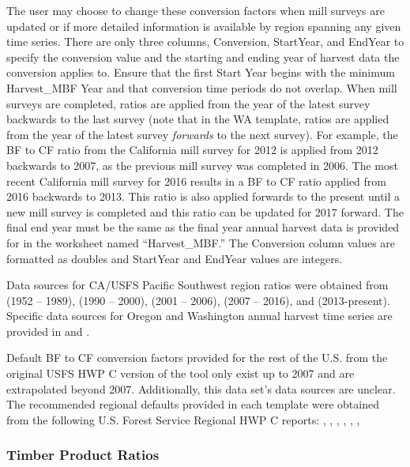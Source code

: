 \documentclass[
  openany]{book}
\begin{document}
The user may choose to change these conversion factors when mill surveys are updated or if more detailed information is available by region spanning any given time series. There are only three columns, Conversion, StartYear, and EndYear to specify the conversion value and the starting and ending year of harvest data the conversion applies to. Ensure that the first Start Year begins with the minimum Harvest\_MBF Year and that conversion time periods do not overlap. When mill surveys are completed, ratios are applied from the year of the latest survey backwards to the last survey (note that in the WA template, ratios are applied from the year of the latest survey \emph{forwards} to the next survey). For example, the BF to CF ratio from the California mill survey for 2012 is applied from 2012 backwards to 2007, as the previous mill survey was completed in 2006. The most recent California mill survey for 2016 results in a BF to CF ratio applied from 2016 backwards to 2013. This ratio is also applied forwards to the present until a new mill survey is completed and this ratio can be updated for 2017 forward. The final end year must be the same as the final year annual harvest data is provided for in the worksheet named ``Harvest\_MBF.'' The Conversion column values are formatted as doubles and StartYear and EndYear values are integers.

Data sources for CA/USFS Pacific Southwest region ratios were obtained from \textcite{keegan2010} (1952 -- 1989), \textcite{morgan2004} (1990 -- 2000), \textcite{morgan2012} (2001 -- 2006), \textcite{mciver2015} (2007 -- 2016), and \textcite{marcille2020} (2013-present). Specific data sources for Oregon and Washington annual harvest time series are provided in \textcite{morgan2021} and \textcite{nichols2020}.

Default BF to CF conversion factors provided for the rest of the U.S. from the original USFS HWP C version of the tool only exist up to 2007 and are extrapolated beyond 2007. Additionally, this data set's data sources are unclear. The recommended regional defaults provided in each template were obtained from the following U.S. Forest Service Regional HWP C reports: \textcite{butler2014nw}, \textcite{butler2014sw}, \textcite{loeffler2014er}, \textcite{loeffler2014sr}, \textcite{stockmann2014nr}, \textcite{stockmann2014imr}, \textcite{stockmann2014rmr}

\hypertarget{own-prov-input-tpr}{%
\subsubsection{Timber Product Ratios}\label{own-prov-input-tpr}}
\end{document}
